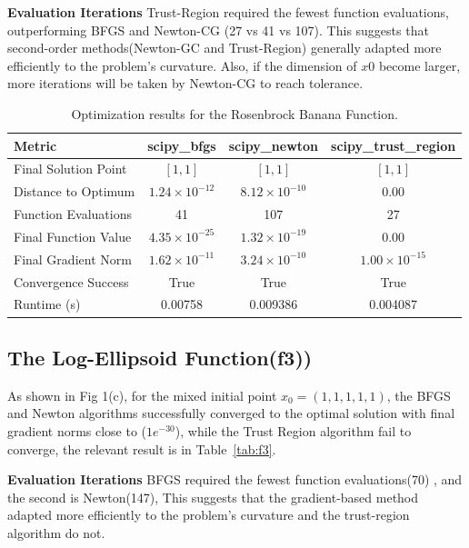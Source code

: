 \documentclass[12pt]{article}
\begin{document}
\textbf{Evaluation Iterations}  
Trust-Region required the fewest function evaluations, outperforming BFGS and Newton-CG (27 vs 41 vs 107). This suggests that second-order methods(Newton-GC and Trust-Region) generally adapted more efficiently to the problem’s curvature. Also, if the dimension of $x0$ become larger, more iterations will be taken by Newton-CG to reach tolerance.


\begin{table}[h]
    \centering
\begin{tabular}{lccc}
    \toprule
    Metric & scipy\_bfgs & scipy\_newton & scipy\_trust\_region \\
    \midrule
    Final Solution Point & $[1, 1]$ & $[1, 1]$ & $[1, 1]$ \\
    Distance to Optimum & $1.24\times10^{-12}$ & $8.12\times10^{-10}$ & $0.00$ \\
    Function Evaluations & 41 & 107 & 27 \\
    Final Function Value & $4.35\times10^{-25}$ & $1.32\times10^{-19}$ & $0.00$ \\
    Final Gradient Norm & $1.62\times10^{-11}$ & $3.24\times10^{-10}$ & $1.00\times10^{-15}$ \\
    Convergence Success & True & True & True \\
    Runtime (s) & 0.00758 & 0.009386 & 0.004087 \\
    \bottomrule
\end{tabular}
    \caption{Optimization results for the Rosenbrock Banana Function.}
    \label{tab:f2}
\end{table}


\subsection{The Log-Ellipsoid Function(f3))}
As shown in Fig 1(c),  for the mixed initial point $x_0 = (1, 1,1 ,1, 1)$, the BFGS and Newton algorithms successfully  converged to the optimal solution with final gradient norms close to ($1e^{-30}$), while the Trust Region algorithm fail to converge, the relevant result is in Table~\ref{tab:f3}.

\textbf{Evaluation Iterations}  BFGS required the fewest function evaluations(70) , and the second is Newton(147),  This suggests that the gradient-based method adapted more efficiently to the problem’s
curvature and the trust-region algorithm do not.
\end{document}
